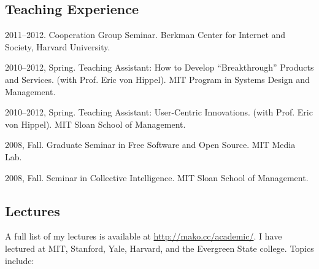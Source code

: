 \documentclass[10pt]{article}
\newenvironment{cvlist}{
\begin{list}{}{\leftmargin=3.0em \itemindent=-3.0em}
  \setlength{\itemsep}{0pt}
  \setlength{\parskip}{0em}
  \setlength{\parsep}{1em}
  \setlength{\parindent}{0em}}
{\vspace{1em}
\end{list}}
\begin{document}
\subsection{Teaching Experience}
\begin{cvlist}
\item 2011--2012. Cooperation Group Seminar. Berkman Center
  for Internet and Society, Harvard University.
\item 2010--2012, Spring. Teaching Assistant: How to Develop ``Breakthrough''
  Products and Services. (with Prof. Eric von Hippel). MIT Program in
  Systems Design and Management.
\item 2010--2012, Spring. Teaching Assistant: User-Centric
  Innovations. (with Prof. Eric von Hippel). MIT Sloan School of
  Management.
\item 2008, Fall. Graduate Seminar in Free Software and Open
  Source. MIT Media Lab.
\item 2008, Fall. Seminar in Collective Intelligence. MIT Sloan School
  of Management.
\end{cvlist}

\subsection{Lectures}

A full list of my lectures is available at
\url{http://mako.cc/academic/}. I have lectured at MIT, Stanford,
Yale, Harvard, and the Evergreen State college. Topics include:
\end{document}
